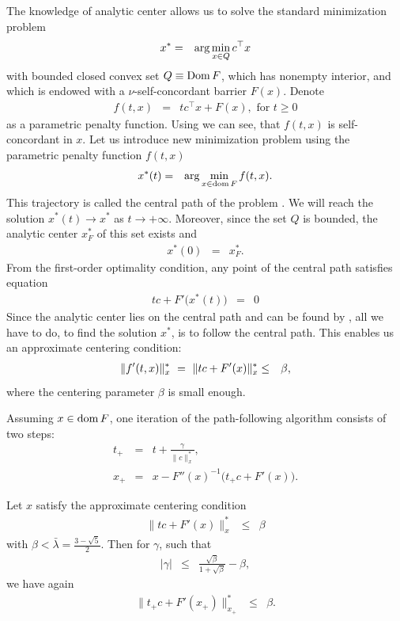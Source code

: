 The knowledge of analytic center allows us to solve the standard minimization problem
\begin{eqnarray}
  x^* &=& \arg\min_{x\in Q} c^\top x \labeleq{SDP:scb:standardProblem}
\end{eqnarray}
with bounded closed convex set $Q \equiv \operatorname{Dom} F$, which has nonempty interior, and which is endowed with a $\nu$-self-concordant barrier $F(x)$.
Denote
\begin{eqnarray}
  f(t,x) &=& tc^\top x + F(x), \text{ for } t \geq 0
\end{eqnarray}
as a parametric penalty function.
Using  we can see, that $f(t,x)$ is self-concordant in $x$.
Let us introduce new minimization problem using the parametric penalty function $f(t,x)$
\begin{eqnarray}
  x^*(t) &=& \arg\min_{x\in\dom F} f(t,x).\labeleq{SDP:scb:centralPath}
\end{eqnarray}
This trajectory is called the central path of the problem .
We will reach the solution $x^*(t) \rightarrow x^*$ as $t \rightarrow +\infty$.
Moreover, since the set $Q$ is bounded, the analytic center $x^*_F$ of this set exists and
\begin{eqnarray}
  x^*(0) &=& x^*_F.
\end{eqnarray}
From the first-order optimality condition, any point of the central path satisfies equation
\begin{eqnarray}
  tc + F'\big(x^*(t)\big) &=& 0
\end{eqnarray}
Since the analytic center lies on the central path and can be found by , all we have to do, to find the solution $x^*$, is to follow the central path. 
This enables us an approximate centering condition:
\begin{eqnarray}
  \|f'(t,x)\|^*_x\ =\ \|tc + F'(x)\|^*_x &\leq& \beta, \labeleq{SDP:scb:cntrCondition}
\end{eqnarray}
where the centering parameter $\beta$ is small enough.

Assuming $x\in\operatorname{dom} F$, one iteration of the path-following algorithm consists of two steps:
\begin{eqnarray}
  t_+ &=& t + \frac{\gamma}{\|c\|^*_x},\\
  x_+ &=& x - F''(x)^{-1}\big(t_+c+F'(x)\big).
\end{eqnarray}

\begin{theorem}
  Let $x$ satisfy the approximate centering condition 
  \begin{eqnarray}
    \|tc + F'(x)\|^*_x &\leq& \beta
  \end{eqnarray}
  with $\beta < \bar{\lambda} = \frac{3-\sqrt{5}}{2}$.
  Then for $\gamma$, such that
  \begin{eqnarray}
    |\gamma| &\leq& \frac{\sqrt{\beta}}{1+\sqrt{\beta}} - \beta,
  \end{eqnarray}
  we have again
  \begin{eqnarray}
    \|t_+c + F'(x_+)\|^*_{x_+} &\leq& \beta.
  \end{eqnarray}
\end{theorem}

